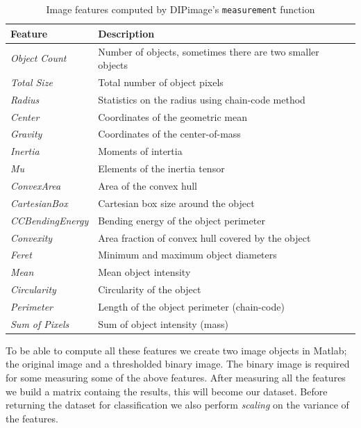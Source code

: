 \documentclass{article}
\begin{document}
\begin{table}[H]
    \small
	\centering
    \begin{tabular}{|l|l|}
    \hline
    \textbf{Feature} & \textbf{Description} \\
    \hline
    \emph{Object Count}     & Number of objects, sometimes there are two smaller objects \\
    \emph{Total Size}       & Total number of object pixels           \\
    \emph{Radius}       	& Statistics on the radius using chain-code method           \\
    \emph{Center}  		& Coordinates of the geometric mean \\
    \emph{Gravity} 		& Coordinates of the center-of-mass \\
    \emph{Inertia} 		& Moments of intertia \\
    \emph{Mu} 				& Elements of the inertia tensor \\
    \emph{ConvexArea} 		& Area of the convex hull \\
    \emph{CartesianBox} 	& Cartesian box size around the object \\
    \emph{CCBendingEnergy} & Bending energy of the object perimeter \\
    \emph{Convexity} 		& Area fraction of convex hull covered by the object \\
    \emph{Feret} 			& Minimum and maximum object diameters \\
    \emph{Mean} 			& Mean object intensity \\
    \emph{Circularity} 	& Circularity of the object \\
    \emph{Perimeter} 		& Length of the object perimeter (chain-code) \\
    \emph{Sum of Pixels} 	& Sum of object intensity (mass) \\
    \hline
    \end{tabular}
    \caption{Image features computed by DIPimage's \texttt{measurement} function \label{table:image-features}}
\end{table}

To be able to compute all these features we create two image objects in Matlab; the original image and a thresholded binary image. The binary image is required for some measuring some of the above features. After measuring all the features we build a matrix containg the results, this will become our dataset. Before returning the dataset for classification we also perform \emph{scaling} on the variance of the features.
\end{document}
